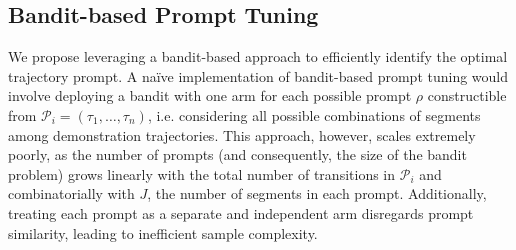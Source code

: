 \documentclass{article} %
\begin{document}
\subsection{Bandit-based Prompt Tuning}

We propose leveraging a bandit-based approach to efficiently identify the optimal trajectory prompt. A na\"ive implementation of bandit-based prompt tuning would involve deploying a bandit with one arm for each possible prompt $\rho$ constructible from $\mathcal{P}_i = (\tau_1, \dots, \tau_n)$, i.e. considering all possible combinations of segments among demonstration trajectories. This approach, however, scales extremely poorly, as the number of prompts (and consequently, the size of the bandit problem) grows linearly with the total number of transitions in $\mathcal{P}_i$ and combinatorially with $J$, the number of segments in each prompt. Additionally, treating each prompt as a separate and independent arm disregards prompt similarity, leading to inefficient sample complexity.
\end{document}
